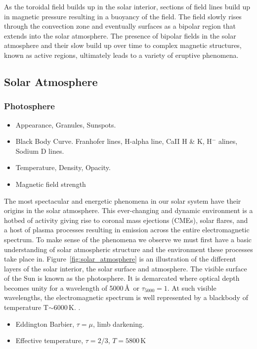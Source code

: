 As the toroidal field builds up in the solar interior, sections of field lines build up in magnetic pressure resulting in a buoyancy of the field. The field slowly rises through the convection zone and eventually surfaces as a bipolar region that extends into the solar atmosphere. The presence of bipolar fields in the solar atmosphere and their slow build up over time to complex magnetic structures, known as active regions, ultimately leads to a variety of eruptive phenomena.



\subsection{Solar Atmosphere}\label{sec:12}

\subsubsection{Photosphere}\label{sec:121}

\begin{itemize}
\item Appearance, Granules, Sunspots.
\item Black Body Curve. Franhofer lines, H-alpha line, CaII H \& K, H$^{-}$ alines, Sodium D lines. 
\item Temperature, Density, Opacity.
\item Magnetic field strength
\end{itemize}

The most spectacular and energetic phenomena in our solar system have their origins in the solar atmosphere. This ever-changing and dynamic environment is a hotbed of activity giving rise to coronal mass ejections (CMEs), solar flares, and a host of plasma processes resulting in emission across the entire electromagnetic spectrum. To make sense of the phenomena we observe we must first have a basic understanding of solar atmospheric structure and the environment these processes take place in. Figure~\ref{fig:solar_atmosphere} is an illustration of the different layers of the solar interior, the solar surface and atmosphere. The visible surface of the Sun is known as the photosphere. It is demarcated where optical depth becomes unity for a wavelength of 5000\,\AA\ or $\tau_{5000}=1$. At such visible wavelengths, the electromagnetic spectrum is well represented by a blackbody of temperature T$\sim$6000\,K. .

\begin{itemize}
\item Eddington Barbier, $\tau=\mu$, limb darkening.
\item Effective temperature, $\tau=2/3$, $T=5800$\,K
\end{itemize}

